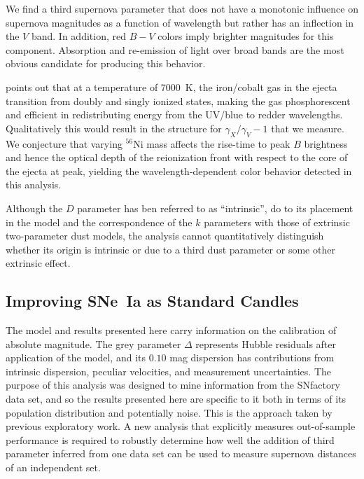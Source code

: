 \documentclass{aastex61}   	%
\begin{document}
We find a third supernova parameter that does not have a monotonic influence on supernova magnitudes as a function
of wavelength but rather has an inflection in the $V$ band.  In addition, red $B-V$ colors imply brighter magnitudes
for this component.  Absorption and re-emission of light
over broad bands are the most obvious candidate for producing this behavior.

\citet{2006ApJ...649..939K} points out that at a temperature of 7000~K, the iron/cobalt gas in the ejecta transition
from doubly and singly ionized states, making the gas phosphorescent and efficient in redistributing energy from the UV/blue to redder
wavelengths.  Qualitatively this would result in the structure for $\gamma_X/\gamma_V-1$ that we measure.
We conjecture that varying $^{56}$Ni mass affects the rise-time to peak $B$ brightness and hence the optical depth
of the reionization front with respect to the core of the ejecta at peak, yielding the wavelength-dependent color behavior
detected in this analysis.


Although the $D$ parameter has ben referred to as ``intrinsic'', do to its placement in the model and the correspondence
of the $k$ parameters with those of extrinsic two-parameter dust models, the analysis cannot quantitatively distinguish
whether its origin is intrinsic or due to a third dust parameter or some other extrinsic effect.

\subsection{Improving SNe~Ia as Standard Candles}
The model and results presented here
carry information on the calibration of absolute magnitude.  The grey parameter $\Delta$ represents Hubble residuals after
application of the model, and its  $0.10$ mag dispersion has contributions from intrinsic dispersion, peculiar velocities, and
measurement uncertainties.
\color{red}
The purpose of this analysis was designed to mine information from the SNfactory data set, and so the results presented here
are specific to it both in terms of its population distribution and potentially noise.  This is the approach taken by previous
exploratory work.
A new analysis that explicitly measures out-of-sample performance is required to robustly determine how
well the addition of third parameter inferred from one data set can be used to measure supernova distances
of an independent set.
\color{black}
\end{document}
